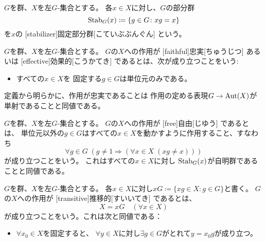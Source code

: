 \documentclass[report]{jlreq}
\begin{document}
\begin{definition}[固定部分群]
    $G$を群、$X$を左$G$-集合とする。
    各$x \in X$に対し、$G$の部分群
    \begin{equation}
        \operatorname{Stab}_G(x) \coloneqq \{ g \in G \colon xg = x \}
    \end{equation}
    を$x$の
    [stabilizer]{固定部分群}[こていぶぶんぐん]
    という。
\end{definition}

\begin{definition}[忠実作用]
    $G$を群、$X$を左$G$-集合とする。
    $G$の$X$への作用が
    [faithful]{忠実}[ちゅうじつ]
    あるいは
    [effective]{効果的}[こうかてき]
    であるとは、次が成り立つことをいう:
    \begin{itemize}
        \item すべての$x \in X$を
            固定する$g \in G$は単位元のみである。
    \end{itemize}
    定義から明らかに、作用が忠実であることは
    作用の定める表現$G \to \operatorname{Aut}(X)$が単射であることと同値である。
\end{definition}

\begin{definition}[自由作用]
    $G$を群、$X$を左$G$-集合とする。
    $G$の$X$への作用が
    [free]{自由}[じゆう]
    であるとは、
    単位元以外の$g \in G$はすべての$x \in X$を動かすように作用すること、すなわち
    \begin{equation}
        \forall g \in G \; (g \neq 1 \Rightarrow (\forall x \in X \; (xg \neq x)))
    \end{equation}
    が成り立つことをいう。
    これはすべての$x \in X$に対し
    $\operatorname{Stab}_G(x)$が自明群であることと同値である。
\end{definition}

\begin{definition}[推移的作用]
    $G$を群、$X$を左$G$-集合とする。
    各$x \in X$に対し$xG \coloneqq \{ xg \in X \colon g \in G \}$と書く。
    $G$の$X$への作用が
    [transitive]{推移的}[すいいてき]
    であるとは、
    \begin{equation}
        X = xG \quad (\forall x \in X)
    \end{equation}
    が成り立つことをいう。これは次と同値である：
    \begin{itemize}
        \item $\forall x_0 \in X$を固定すると、
            $\forall y \in X$に対し$\exists g \in G$がとれて$y = x_0 g$が成り立つ。
    \end{itemize}
\end{definition}
\end{document}
